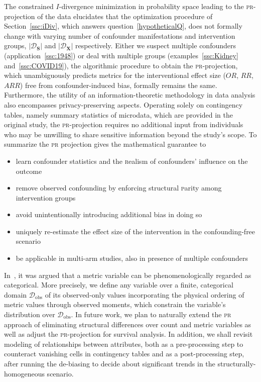 \documentclass[10pt]{article}
\newcommand{\prob}[1]{\mathfrak{#1}}
\begin{document}
The %
constrained $I$-divergence minimization in probability space leading to the \textsc{pr}-projection of the data %
elucidates that the optimization procedure of Section~\ref{ssc:iDiv}, which answers question~\ref{hypotheticalQ}, 
does not formally change with varying number of confounder manifestations and intervention groups, $\vert\mathcal D_{\boldsymbol S}\vert$ and $\vert\mathcal D_{\boldsymbol X}\vert$ respectively. 
Either we suspect multiple confounders (application~\ref{ssc:1948})  or deal with multiple  groups (examples~\ref{ssc:Kidney} and~\ref{ssc:COVID19}), the algorithmic procedure %
to obtain %
the
\textsc{pr}-projection, which unambiguously predicts metrics for the interventional effect size ($OR$, $RR$, $ARR$) free from confounder-induced bias, formally remains the same.  
Furthermore, the utility of an information-theoretic methodology in data analysis also encompasses privacy-preserving aspects.
Operating solely on contingency tables, namely summary statistics of microdata, which are provided in the original study, the \textsc{pr}-projection requires no additional input from individuals who  may be unwilling to share sensitive information beyond the study's scope.
%
To summarize the \textsc{pr} projection gives the mathematical guarantee to
\begin{itemize}[topsep=0.1pt,before=\vspace{1mm},after=\vspace{2mm}]
    \setlength\itemsep{0.1em}
    \item learn confounder statistics and the \textsc{r}ealism of confounders' influence on the outcome
    \item remove observed confounding by enforcing structural \textsc{p}arity among intervention groups
    \item avoid unintentionally introducing additional bias in doing so
    \item uniquely re-estimate the effect size of the intervention in the confounding-free scenario
    \item be applicable in multi-arm studies, also in presence of multiple confounders
\end{itemize}%

In~\cite{loukas2023total}, it was argued that a metric variable can be phenomenologically regarded as categorical. More precisely, we define any variable over a finite, categorical domain $\mathcal D_\text{obs}$ of its observed-only values incorporating the physical ordering of metric values through observed moments, which constrain  the variable's distribution over $\mathcal D_\text{obs}$. 
In future work, we plan to naturally extend the \textsc{pr} approach of eliminating structural differences over count and metric variables as well as adjust the \textsc{pr}-projection for survival analysis. In addition, we shall revisit modeling of relationships between attributes, both as a pre-processing step to counteract vanishing cells in contingency tables and as a post-processing step,  after running the de-biasing to decide about significant trends in the structurally-homogeneous scenario. %
\end{document}
